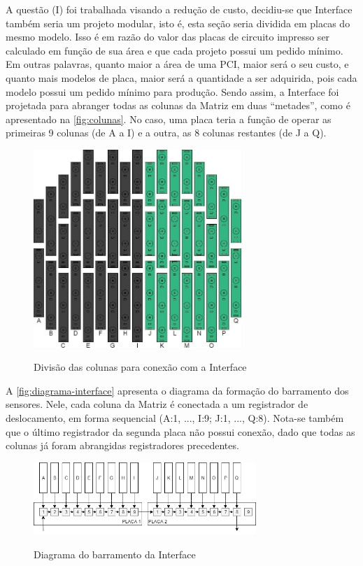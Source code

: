 A questão (I) foi trabalhada visando a redução de custo, decidiu-se que Interface também seria um projeto modular, isto é, esta seção seria dividida em placas do mesmo modelo. Isso é em razão do valor das placas de circuito impresso ser calculado em função de sua área e que cada projeto possui um pedido mínimo. Em outras palavras, quanto maior a área de uma PCI, maior será o seu custo, e quanto mais modelos de placa, maior será a quantidade a ser adquirida, pois cada modelo possui um pedido mínimo para produção. Sendo assim, a Interface foi projetada para abranger todas as colunas da Matriz em duas ``metades'', como é apresentado na \autoref{fig:colunas}. No caso, uma placa teria a função de operar as primeiras 9 colunas (de A a I) e a outra, as 8 colunas restantes (de J a Q).

\begin{figure}[H]
    \centering
    \caption{Divisão das colunas para conexão com a Interface}
    \includegraphics[width=0.7\textwidth]{./dados/figuras/colunas}
    \label{fig:colunas}
\end{figure}

A \autoref{fig:diagrama-interface} apresenta o diagrama da formação do barramento dos sensores. Nele, cada coluna da Matriz é conectada a um registrador de deslocamento, em forma sequencial (A:1, ..., I:9; J:1, ..., Q:8). Nota-se também que o último registrador da segunda placa não possui conexão, dado que todas as colunas já foram abrangidas registradores precedentes.

\begin{figure}[H]
    \centering
    \caption{Diagrama do barramento da Interface}
    \includegraphics[width=0.75\textwidth]{./dados/figuras/interface}
    \label{fig:diagrama-interface}
\end{figure}


